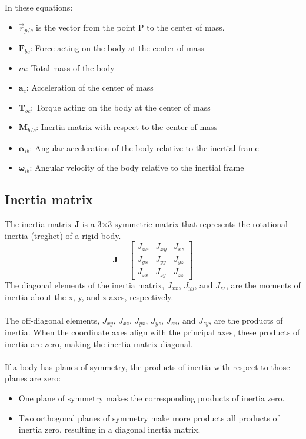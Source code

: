 In these equations:
\begin{itemize}
    \item $\vec{r}_{p/c}$ is the vector from the point P to the center of mass.
    \item $\mathbf{F}_{bc}$: Force acting on the body at the center of mass
    \item $m$: Total mass of the body
    \item $\mathbf{a}_c$: Acceleration of the center of mass
    \item $\mathbf{T}_{bc}$: Torque acting on the body at the center of mass
    \item $\mathbf{M}_{b/c}$: Inertia matrix with respect to the center of mass
    \item $\boldsymbol{\alpha}_{ib}$: Angular acceleration of the body relative to the inertial frame
    \item $\boldsymbol{\omega}_{ib}$: Angular velocity of the body relative to the inertial frame
\end{itemize}

\subsection{Inertia matrix}
The inertia matrix \textbf{J} is a 3×3 symmetric matrix that represents the rotational inertia (treghet) of a rigid body. 
\[
\mathbf{J} = \begin{bmatrix}
    J_{xx} & J_{xy} & J_{xz} \\
    J_{yx} & J_{yy} & J_{yz} \\
    J_{zx} & J_{zy} & J_{zz}
\end{bmatrix}
\]
The diagonal elements of the inertia matrix, \( J_{xx} \), \( J_{yy} \), and \( J_{zz} \), are the moments of inertia about the x, y, and z axes, respectively. 
\\
\\
The off-diagonal elements, \( J_{xy} \), \( J_{xz} \), \( J_{yx} \), \( J_{yz} \), \( J_{zx} \), and \( J_{zy} \), are the products of inertia. When the coordinate axes align with the principal axes, these products of inertia are zero, making the inertia matrix diagonal.
\\
\\
If a body has planes of symmetry, the products of inertia with respect to those planes are zero:
\begin{itemize}
    \item One plane of symmetry makes the corresponding products of inertia zero.
    \item Two orthogonal planes of symmetry make more products all products of inertia zero, resulting in a diagonal inertia matrix.
\end{itemize}

